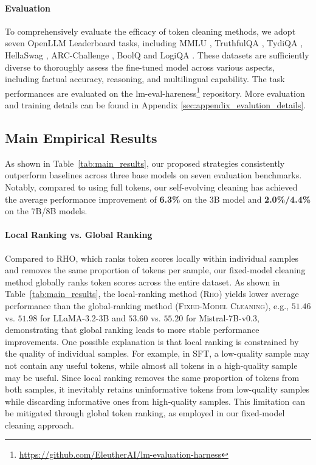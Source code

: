 \paragraph{Evaluation} To comprehensively evaluate the efficacy of token cleaning methods, we adopt seven OpenLLM Leaderboard tasks, including MMLU \citep{hendrycks2020measuring}, TruthfulQA \citep{lin2021truthfulqa}, TydiQA \citep{clark2020tydi}, HellaSwag \citep{zellers2019hellaswag}, ARC-Challenge \citep{clark2018think},  BoolQ \citep{clark2019boolq} and LogiQA \citep{liu2020logiqa}. These datasets are sufficiently diverse to thoroughly assess the fine-tuned model across various aspects, including factual accuracy, reasoning, and multilingual capability.
The task performances are evaluated on the lm-eval-hareness\footnote{\url{https://github.com/EleutherAI/lm-evaluation-harness}} repository. More evaluation and training details can be found in Appendix \ref{sec:appendix_evalution_details}.





\subsection{Main Empirical Results}


As shown in Table~\ref{tab:main_results}, our proposed strategies consistently outperform baselines across three base models on seven evaluation benchmarks. Notably, compared to using full tokens, our self-evolving cleaning has achieved the average performance improvement of \textbf{6.3\%} on the 3B model and \textbf{2.0\%/4.4\%} on the 7B/8B models. 

\paragraph{Local Ranking vs. Global Ranking}
Compared to RHO, which ranks token scores locally within individual samples and removes the same proportion of tokens per sample, our fixed-model cleaning method globally ranks token scores across the entire dataset. As shown in Table~\ref{tab:main_results}, the local-ranking method (\textsc{Rho}) yields lower average performance than the global-ranking method (\textsc{Fixed-Model Cleaning}), e.g., $51.46$ vs. $51.98$ for LLaMA-3.2-3B and $53.60$ vs. $55.20$ for Mistral-7B-v0.3, demonstrating that global ranking leads to more stable performance improvements.
One possible explanation is that local ranking is constrained by the quality of individual samples. For example, in SFT, a low-quality sample may not contain any useful tokens, while almost all tokens in a high-quality sample may be useful. Since local ranking removes the same proportion of tokens from both samples, it inevitably retains uninformative tokens from low-quality samples while discarding informative ones from high-quality samples.
This limitation can be mitigated through global token ranking, as employed in our fixed-model cleaning approach.




